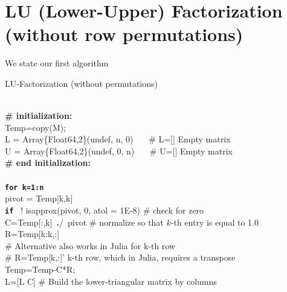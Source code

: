 \vspace*{.4cm}
\section{LU (Lower-Upper) Factorization (without row permutations)}
\label{sec:LUwithoutPermutations}

We state our first algorithm\\

\begin{tcolorbox}[sharp corners, colback=green!30, colframe=green!80!blue, title=\textbf{\Large LU Factorization (without permutations)}]
\begin{algorithm}[H]
\SetAlgoLined
{}
 \caption{LU-Factorization (without permutations)}
\end{algorithm}
\mbox{} \\
 \textbf{\# initialization:}\\
{\rm Temp}=copy(M); \\
L = Array\{Float64,2\}(undef, n, 0)  ~~~\# L=[] Empty matrix\\
U = Array\{Float64,2\}(undef, 0, n)  ~~~\# U=[] Empty matrix\\
\textbf{\# end initialization:}\\
  \mbox{} \\
\texttt{\bf for {k=1:n}} \\
\hspace*{.3cm}    pivot = Temp[k,k] \\
\hspace*{.3cm} \texttt{\bf if } ! isapprox(pivot, 0, atol = 1E-8) \# check for zero \\
\hspace*{.6cm}    C=Temp[:,k]~{\bf \large .}/~pivot \# normalize so that $k$-th entry is equal to 1.0 \\
\hspace*{.6cm}      R={\rm Temp}[k:k,:] \\
\hspace*{.6cm}     \# Alternative also works in Julia for k-th row\\
\hspace*{.6cm}     \# R={\rm Temp}[k,:]' k-th row, which in Julia, requires a transpose     \\
\hspace*{.6cm}     {\rm Temp}={\rm Temp}-C*R; \\
\hspace*{.6cm}    L=[L C] \# Build the lower-triangular matrix by columns\\

\end{tcolorbox}
